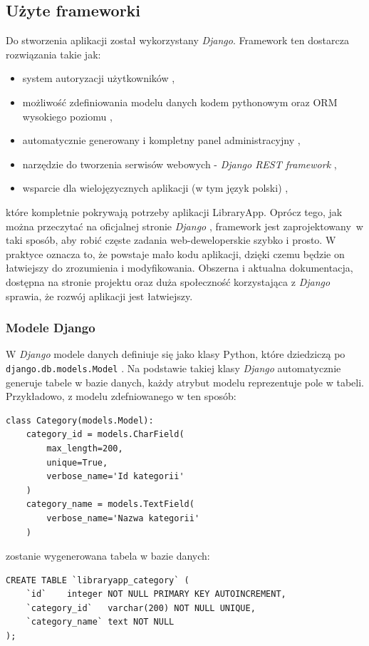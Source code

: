 \documentclass[twoside]{projektInzynierskiMS}
\begin{document}
\subsection{Użyte frameworki}

Do stworzenia aplikacji został wykorzystany \textit{Django}. Framework ten dostarcza rozwiązania takie jak:
\begin{itemize}
	\item system autoryzacji użytkowników \cite{DjangoAuth},
	\item możliwość zdefiniowania modelu danych kodem pythonowym oraz ORM wysokiego poziomu \cite{DjangoORM},
	\item automatycznie generowany i kompletny panel administracyjny \cite{DjangoAdmin},
	\item narzędzie do tworzenia serwisów webowych - \textit{Django REST framework} \cite{DjangoRest},
	\item wsparcie dla wielojęzycznych aplikacji (w tym język polski) \cite{DjangoTranslation},
\end{itemize}
które kompletnie pokrywają potrzeby aplikacji LibraryApp. Oprócz tego, jak można przeczytać na oficjalnej stronie \textit{Django} \cite{DjangoOfficial}, framework jest zaprojektowany~w taki sposób, aby robić częste zadania web-deweloperskie szybko i prosto. W praktyce oznacza to, że powstaje mało kodu aplikacji, dzięki czemu będzie on łatwiejszy do zrozumienia i modyfikowania. Obszerna i aktualna dokumentacja, dostępna na stronie projektu oraz duża społeczność korzystająca z \textit{Django} sprawia, że rozwój aplikacji jest łatwiejszy.

\subsubsection{Modele Django}
W \textit{Django} modele danych definiuje się jako klasy Python, które dziedziczą po \verb`django.db.models.Model` \cite{DjangoModel}. Na podstawie takiej klasy \textit{Django} automatycznie generuje tabele w bazie danych, każdy atrybut modelu reprezentuje pole w tabeli. Przykładowo, z modelu zdefniowanego w ten sposób:

\begin{verbatim}
class Category(models.Model):
    category_id = models.CharField(
        max_length=200,
        unique=True,
        verbose_name='Id kategorii'
    )
    category_name = models.TextField(
        verbose_name='Nazwa kategorii'
    )
\end{verbatim}
zostanie wygenerowana tabela w bazie danych:
\begin{verbatim}
CREATE TABLE `libraryapp_category` (
	`id`	integer NOT NULL PRIMARY KEY AUTOINCREMENT,
	`category_id`	varchar(200) NOT NULL UNIQUE,
	`category_name`	text NOT NULL
);
\end{verbatim}
\end{document}
